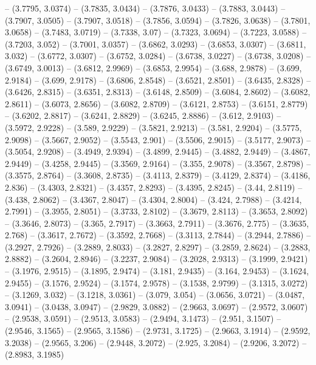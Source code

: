 {   -- (3.7795, 3.0374) -- (3.7835, 3.0434) -- (3.7876, 3.0433) -- (3.7883, 
  3.0443) -- (3.7907, 3.0505) -- (3.7907, 3.0518) -- (3.7856, 3.0594) -- 
  (3.7826, 3.0638) -- (3.7801, 3.0658) -- (3.7483, 3.0719) -- (3.7338, 3.07) -- 
  (3.7323, 3.0694) -- (3.7223, 3.0588) -- (3.7203, 3.052) -- (3.7001, 3.0357) --
   (3.6862, 3.0293) -- (3.6853, 3.0307) -- (3.6811, 3.032) -- (3.6772, 3.0307) 
  -- (3.6752, 3.0284) -- (3.6738, 3.0227) -- (3.6738, 3.0208) -- (3.6749, 
  3.0013) -- (3.6812, 2.9969) -- (3.6853, 2.9954) -- (3.688, 2.9878) -- (3.699, 
  2.9184) -- (3.699, 2.9178) -- (3.6806, 2.8548) -- (3.6521, 2.8501) -- (3.6435,
   2.8328) -- (3.6426, 2.8315) -- (3.6351, 2.8313) -- (3.6148, 2.8509) -- 
  (3.6084, 2.8602) -- (3.6082, 2.8611) -- (3.6073, 2.8656) -- (3.6082, 2.8709) 
  -- (3.6121, 2.8753) -- (3.6151, 2.8779) -- (3.6202, 2.8817) -- (3.6241, 
  2.8829) -- (3.6245, 2.8886) -- (3.612, 2.9103) -- (3.5972, 2.9228) -- (3.589, 
  2.9229) -- (3.5821, 2.9213) -- (3.581, 2.9204) -- (3.5775, 2.9098) -- (3.5667,
   2.9052) -- (3.5543, 2.901) -- (3.5506, 2.9015) -- (3.5177, 2.9073) -- 
  (3.5054, 2.9208) -- (3.4949, 2.9394) -- (3.4899, 2.9445) -- (3.4882, 2.9449) 
  -- (3.4867, 2.9449) -- (3.4258, 2.9445) -- (3.3569, 2.9164) -- (3.355, 2.9078)
   -- (3.3567, 2.8798) -- (3.3575, 2.8764) -- (3.3608, 2.8735) -- (3.4113, 
  2.8379) -- (3.4129, 2.8374) -- (3.4186, 2.836) -- (3.4303, 2.8321) -- (3.4357,
   2.8293) -- (3.4395, 2.8245) -- (3.44, 2.8119) -- (3.438, 2.8062) -- (3.4367, 
  2.8047) -- (3.4304, 2.8004) -- (3.424, 2.7988) -- (3.4214, 2.7991) -- (3.3955,
   2.8051) -- (3.3733, 2.8102) -- (3.3679, 2.8113) -- (3.3653, 2.8092) -- 
  (3.3646, 2.8073) -- (3.365, 2.7917) -- (3.3663, 2.7911) -- (3.3676, 2.775) -- 
  (3.3635, 2.768) -- (3.3617, 2.7672) -- (3.3592, 2.7668) -- (3.3113, 2.7844) --
   (3.2944, 2.7886) -- (3.2927, 2.7926) -- (3.2889, 2.8033) -- (3.2827, 2.8297) 
  -- (3.2859, 2.8624) -- (3.2883, 2.8882) -- (3.2604, 2.8946) -- (3.2237, 
  2.9084) -- (3.2028, 2.9313) -- (3.1999, 2.9421) -- (3.1976, 2.9515) -- 
  (3.1895, 2.9474) -- (3.181, 2.9435) -- (3.164, 2.9453) -- (3.1624, 2.9455) -- 
  (3.1576, 2.9524) -- (3.1574, 2.9578) -- (3.1538, 2.9799) -- (3.1315, 3.0272) 
  -- (3.1269, 3.032) -- (3.1218, 3.0361) -- (3.079, 3.054) -- (3.0656, 3.0721) 
  -- (3.0487, 3.0941) -- (3.0438, 3.0947) -- (2.9829, 3.0882) -- (2.9663, 
  3.0697) -- (2.9572, 3.0607) -- (2.9538, 3.0591) -- (2.9513, 3.0583) -- 
  (2.9494, 3.1473) -- (2.951, 3.1507) -- (2.9546, 3.1565) -- (2.9565, 3.1586) --
   (2.9731, 3.1725) -- (2.9663, 3.1914) -- (2.9592, 3.2038) -- (2.9565, 3.206) 
  -- (2.9448, 3.2072) -- (2.925, 3.2084) -- (2.9206, 3.2072) -- (2.8983, 3.1985)
}
